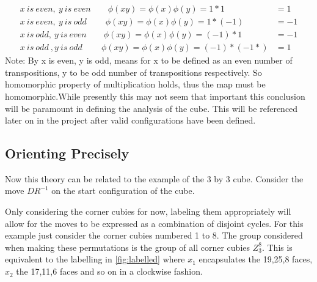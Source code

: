 \documentclass{article}
\newcounter{theo}[section]\setcounter{theo}{0}
\newcounter{prop}[section]\setcounter{prop}{0}
\begin{document}
\begin{align*}
x\ is\ even,\ y\ is\ even\qquad	\phi(xy) = \phi(x)\phi(y) = 1*1 &= 1\\
x\ is\ even,\ y\ is\ odd\ \qquad	\phi(xy) = \phi(x)\phi(y) = 1*(-1) &= -1\\
x\ is\ odd,\ y\ is\ even\qquad	\phi(xy) = \phi(x)\phi(y) = (-1)*1 &= -1\\
x\ is\ odd\ ,y\ is\ odd \ \qquad	\phi(xy) = \phi(x)\phi(y) = (-1)*(-1*) &= 1
\end{align*}
Note: By x is even, y is odd, means for x to be defined as an even number of transpositions, y to be odd number of transpositions respectively. So homomorphic property of multiplication holds, thus the map must be homomorphic.\newline While presently this may not seem that important this conclusion will be paramount in defining the analysis of the cube. This will be referenced later on in the project after valid configurations have been defined.


\newpage
\subsection{Orienting Precisely}

Now this theory can be related to the example of the 3 by 3 cube. Consider the move $DR^{-1}$ on the start configuration of the cube.


\begin{figure}[hbt]
\centering%
  \RubikCubeSolved%
    \hspace{.4cm}
    \quad{}%
    \hspace{.4cm}
  	\hspace{.4cm}
    \quad{}%
    \hspace{.4cm}
\end{figure}
Only considering the corner cubies for now, labeling them appropriately will allow for the moves to be expressed as a combination of disjoint cycles. For this example just consider the corner cubies numbered 1 to 8. The group considered when making these permutations is the group of all corner cubies $Z_{3}^{8}$. This is equivalent to the labelling in \ref{fig:labelled} where $x_1$ encapsulates the 19,25,8 faces, $x_2$ the 17,11,6 faces and so on in a clockwise fashion.
\end{document}
